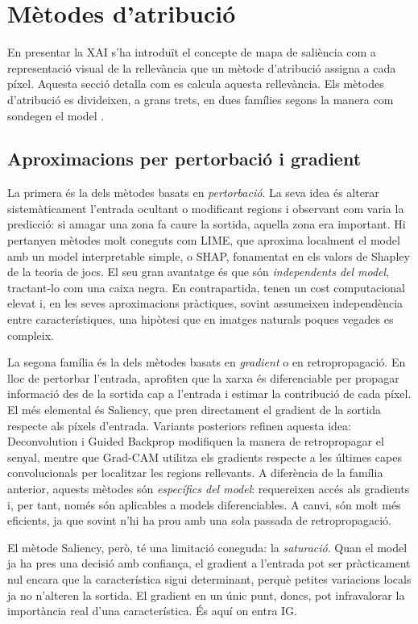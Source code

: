 \section{Mètodes d'atribució}\label{sec:metodes}
En presentar la \ac{XAI} s'ha introduït el concepte de mapa de saliència com a representació visual de la rellevància que un mètode d'atribució assigna a cada píxel. Aquesta secció detalla com es calcula aquesta rellevància. Els mètodes d'atribució es divideixen, a grans trets, en dues famílies segons la manera com sondegen el model \cite{Longo2024}.

\subsection{Aproximacions per pertorbació i gradient}
La primera és la dels mètodes basats en \emph{pertorbació}. La seva idea és alterar sistemàticament l'entrada ocultant o modificant regions i observant com varia la predicció: si amagar una zona fa caure la sortida, aquella zona era important. Hi pertanyen mètodes molt coneguts com LIME\cite{Tulio16}, que aproxima localment el model amb un model interpretable simple, o SHAP, fonamentat en els valors de Shapley de la teoria de jocs. El seu gran avantatge és que són \emph{independents del model}, tractant-lo com una caixa negra. En contrapartida, tenen un cost computacional elevat i, en les seves aproximacions pràctiques, sovint assumeixen independència entre característiques, una hipòtesi que en imatges naturals poques vegades es compleix.

La segona família és la dels mètodes basats en \emph{gradient} o en retropropagació. En lloc de pertorbar l'entrada, aprofiten que la xarxa és diferenciable per propagar informació des de la sortida cap a l'entrada i estimar la contribució de cada píxel. El més elemental és Saliency, que pren directament el gradient de la sortida respecte als píxels d'entrada. Variants posteriors refinen aquesta idea: Deconvolution i Guided Backprop modifiquen la manera de retropropagar el senyal, mentre que Grad-CAM utilitza els gradients respecte a les últimes capes convolucionals per localitzar les regions rellevants. A diferència de la família anterior, aquests mètodes són \emph{específics del model}: requereixen accés als gradients i, per tant, només són aplicables a models diferenciables. A canvi, són molt més eficients, ja que sovint n'hi ha prou amb una sola passada de retropropagació.

El mètode Saliency, però, té una limitació coneguda: la \emph{saturació}. Quan el model ja ha pres una decisió amb confiança, el gradient a l'entrada pot ser pràcticament nul encara que la característica sigui determinant, perquè petites variacions locals ja no n'alteren la sortida. El gradient en un únic punt, doncs, pot infravalorar la importància real d'una característica. És aquí on entra \ac{IG}.

